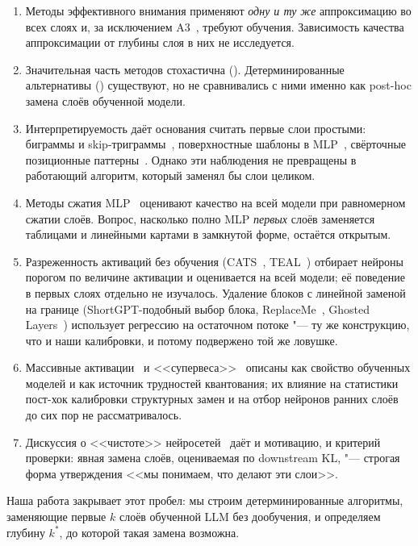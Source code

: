 \begin{enumerate}
  \item Методы эффективного внимания применяют \emph{одну и ту же}
    аппроксимацию во всех слоях и, за исключением A3~\cite{wong2025a3},
    требуют обучения. Зависимость качества аппроксимации от глубины
    слоя в них не исследуется.
  \item Значительная часть методов стохастична
    (\cite{choromanski2021performer,peng2021rfa,kitaev2020reformer,zaheer2020bigbird}).
    Детерминированные альтернативы
    (\cite{xiong2021nystrom,lu2021soft,child2019sparse,leethorp2022fnet})
    существуют, но не сравнивались с ними именно как post-hoc
    замена слоёв обученной модели.
  \item Интерпретируемость даёт основания считать первые слои
    простыми: биграммы и skip-триграммы~\cite{elhage2021framework},
    поверхностные шаблоны в MLP~\cite{geva2021ffn}, свёрточные
    позиционные паттерны~\cite{cordonnier2020relationship}. Однако
    эти наблюдения не превращены в работающий алгоритм, который
    заменял бы слои целиком.
  \item Методы сжатия MLP~\cite{yuan2023asvd,wang2025svdllm,zhang2022moefication,liu2023dejavu}
    оценивают качество на всей модели при равномерном сжатии слоёв. Вопрос,
    насколько полно MLP \emph{первых} слоёв заменяется таблицами и
    линейными картами в замкнутой форме, остаётся открытым.
  \item Разреженность активаций без обучения
    (CATS~\cite{lee2024cats}, TEAL~\cite{liu2024teal}) отбирает нейроны
    порогом по величине активации и оценивается на всей модели; её
    поведение в первых слоях отдельно не изучалось. Удаление блоков с
    линейной заменой на границе (ShortGPT-подобный выбор блока,
    ReplaceMe~\cite{shopkhoev2025replaceme}, Ghosted
    Layers~\cite{yun2026ghosted}) использует регрессию на остаточном
    потоке "--- ту же конструкцию, что и наши калибровки, и потому
    подвержено той же ловушке.
  \item Массивные активации~\cite{sun2024massive} и
    <<супервеса>>~\cite{yu2024superweights} описаны как свойство
    обученных моделей и как источник трудностей квантования; их влияние
    на статистики пост-хок калибровки структурных замен и на отбор
    нейронов ранних слоёв до сих пор не рассматривалось.
  \item Дискуссия о <<чистоте>>
    нейросетей~\cite{cammarata_clean,gao_notclean} даёт и
    мотивацию, и критерий проверки: явная замена слоёв, оцениваемая по
    downstream KL, "--- строгая форма утверждения <<мы понимаем, что
    делают эти слои>>.
\end{enumerate}

Наша работа закрывает этот пробел: мы строим детерминированные
алгоритмы, заменяющие первые $k$ слоёв обученной LLM без дообучения,
и определяем глубину $k^{*}$, до которой такая замена возможна.
